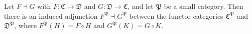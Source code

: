 Let $F \dashv G$ with $F: \mathfrak{C} \to \mathfrak{D}$ and $G: \mathfrak{D} \to \mathfrak{C}$, and let $\mathfrak{P}$ be a small category. Then there is an induced adjunction $F^{\mathfrak{P}} \dashv G^{\mathfrak{P}}$ between the functor categories $\mathfrak{C}^{\mathfrak{P}}$ and $\mathfrak{D}^{\mathfrak{P}}$, where $F^{\mathfrak{P}}(H) = F \circ H$ and $G^{\mathfrak{P}}(K) = G \circ K$.
